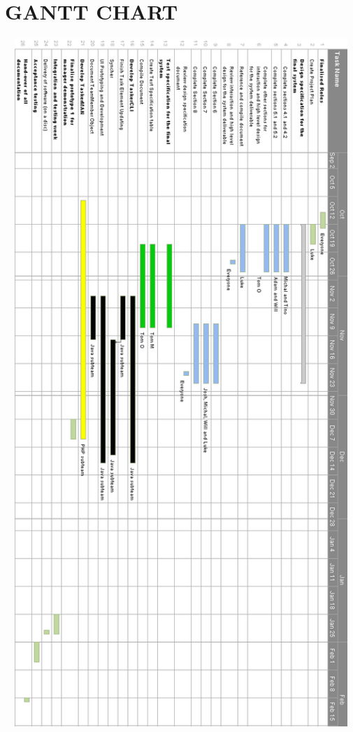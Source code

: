 \documentclass{project}
\begin{document}
\section{GANTT CHART}
\begin{center}
\includegraphics[width = 15cm, height = 26cm]{Ganttchart}
\end{center}
\newpage
\end{document}
